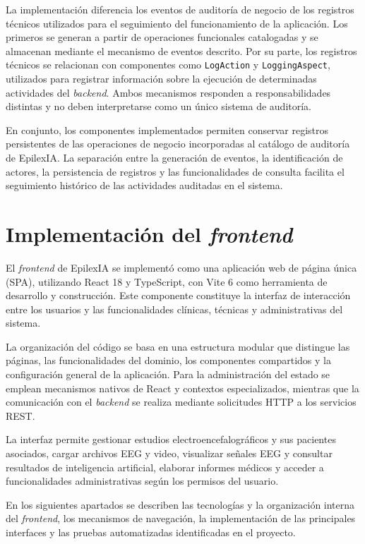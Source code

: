 La implementación diferencia los eventos de auditoría de negocio
de los registros técnicos utilizados para el seguimiento del
funcionamiento de la aplicación. Los primeros se generan a partir
de operaciones funcionales catalogadas y se almacenan mediante
el mecanismo de eventos descrito. Por su parte, los registros
técnicos se relacionan con componentes como
\texttt{LogAction} y \texttt{LoggingAspect}, utilizados para
registrar información sobre la ejecución de determinadas
actividades del \textit{backend}. Ambos mecanismos responden a
responsabilidades distintas y no deben interpretarse como un
único sistema de auditoría.

En conjunto, los componentes implementados permiten conservar registros persistentes de las operaciones de negocio incorporadas al catálogo de auditoría de EpilexIA. La separación entre la generación de eventos, la identificación de actores, la persistencia de registros y las funcionalidades de consulta facilita el seguimiento histórico de las actividades auditadas en el sistema.


\section{Implementación del \textit{frontend}}

El \textit{frontend} de EpilexIA se implementó como una
aplicación web de página única (SPA), utilizando
React 18 y TypeScript, con Vite 6 como herramienta
de desarrollo y construcción. Este componente
constituye la interfaz de interacción entre los
usuarios y las funcionalidades clínicas, técnicas
y administrativas del sistema.

La organización del código se basa en una
estructura modular que distingue las páginas,
las funcionalidades del dominio, los componentes
compartidos y la configuración general de la
aplicación. Para la administración del estado
se emplean mecanismos nativos de React y
contextos especializados, mientras que la
comunicación con el \textit{backend} se realiza mediante
solicitudes HTTP a los servicios REST.

La interfaz permite gestionar estudios
electroencefalográficos y sus pacientes
asociados, cargar archivos EEG y video,
visualizar señales EEG y consultar resultados de inteligencia artificial, elaborar informes médicos y
acceder a funcionalidades administrativas
según los permisos del usuario.

En los siguientes apartados se describen
las tecnologías y la organización interna
del \textit{frontend}, los mecanismos de navegación,
la implementación de las principales
interfaces y las pruebas automatizadas
identificadas en el proyecto.


